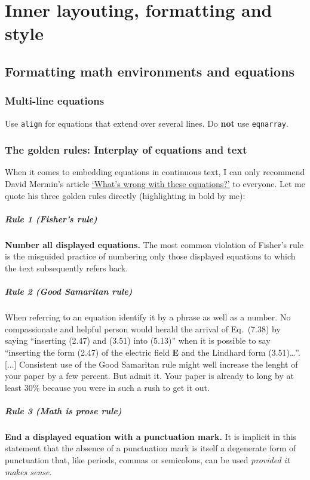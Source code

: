 \chapter{Inner layouting, formatting and style}
\section{Formatting math environments and equations}

\subsection{Multi-line equations}
Use \verb|align| for equations that extend over several lines. Do \textbf{not} use \verb|eqnarray|.

\subsection{The golden rules: Interplay of equations and text}
When it comes to embedding equations in continuous text, I can only recommend David Mermin's article \href{https://wp.optics.arizona.edu/kupinski/wp-content/uploads/sites/91/2023/05/MerminEquations.pdf}{`What's wrong with these equations?'}\cite{mermin1989} to everyone. Let me quote his three golden rules directly (highlighting in bold by me):
\paragraph{Rule 1 (Fisher's rule)} \textbf{Number all displayed equations.} The most common violation of Fisher's rule is the misguided practice of numbering only those displayed equations to which the text subsequently refers back.
\paragraph{Rule 2 (Good Samaritan rule)} When referring to an equation identify it by a phrase as well as a number. No compassionate and helpful person would herald the arrival of Eq.~(7.38) by saying ``inserting (2.47) and (3.51) into (5.13)'' when it is possible to say ``inserting the form (2.47) of the electric field \textbf{E} and the Lindhard form (3.51)\dots''. [...] Consistent use of the Good Samaritan rule might well increase the lenght of your paper by a few percent. But admit it. Your paper is already to long by at least 30\% because you were in such a rush to get it out.
\paragraph{Rule 3 (Math is prose rule)} \textbf{End a displayed equation with a punctuation mark.} It is implicit in this statement that the absence of a punctuation mark is itself a degenerate form of punctuation that, like periods, commas or semicolons, can be used \emph{provided it makes sense.}

